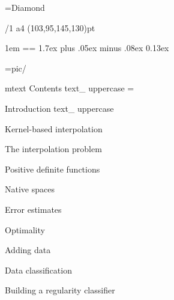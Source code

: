 \useOpTeX  %


\hyperlinks \Black \Black
{}

\enlang
\fontfam[BaskervilleMT]
\fontfam[EBGaramond]
\fontfam[TypewriterMT]
\BaskervilleMT
\typosize[12.2/14.5]
\fontdef\rmfixex{\rm}\fontdef\itfixed{\it}\fontdef\bffixed{\bf}\fontdef\bifixed{\bi}

\font\symbols=Diamond %
\def\QED{\hbox{\symbols\resizethefont \,❖}}
\famvardef{}
\famvardef{}
\famvardef\tt{\TypewriterMT{}\typoscale[870/]\rm}


\margins/1 a4 (103,95,145,130)pt


\parindent 1em
\iindent=\parindent \ttindent=\parindent
\parskip 1.7ex plus .05ex minus .08ex
 0.13ex

\picdir={pic/}





\let\omtext\_mtext
\def\_mtext#1{CONTENTS}
\let\uppercase\ignoreit
\nonum\notoc\chap Contents
\let\_mtext\omtext
\let\uppercase\_uppercase
\bigskip
\maketoc
{}
\footline={}
\vfill\eject


\def\_mtext#1{INTRODUCTION}
\let\uppercase\ignoreit
\nonum\chap Introduction
\let\_mtext\omtext
\let\uppercase\_uppercase


\chap Kernel-based interpolation

\sec The interpolation problem



\sec[positivesec] Positive definite functions


\sec Native spaces


\sec[errorsec] Error estimates


\sec Optimality


\sec[addingsec] Adding data


\chap[classificationchap] Data classification

\sec[buildingsec] Building a regularity classifier


